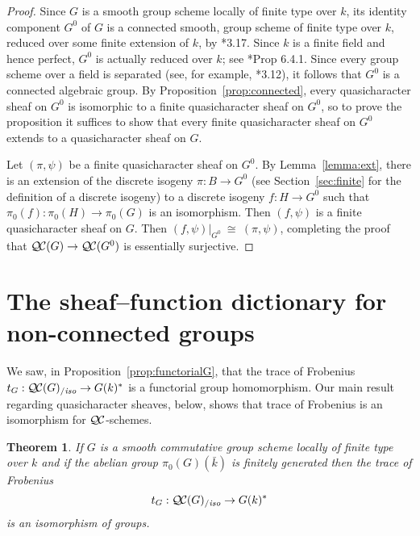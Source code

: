 \documentclass[11pt]{amsart}
\theoremstyle{plain}
\newtheorem{theorem}{Theorem}[section]
\theoremstyle{definition}
\theoremstyle{remark}
\newcommand{\bFq}{\bar{k}}
\newcommand{\Fq}{k}
\newcommand{\iso}{{\ \cong\ }}
\newcommand{\QC}{{\mathcal{Q\hskip-0.8pt C}}}
\newcommand{\QCiso}[1]{\QC(#1)_{/\textit{iso}}}
\newcommand{\trFrob}[1]{t_{#1}}
\begin{document}
\begin{proof}
  Since $G$ is a smooth group scheme locally of finite type over $\Fq$, its
  identity component $G^0$ of $G$ is a connected smooth, 
  group scheme of finite type over $\Fq$, reduced over some finite extension of $\Fq$, by
   \cite{vdGeer-Moonen:AbelianVarieties}*{3.17}. 
	Since $\Fq$ is a finite field and hence perfect, $G^0$ is actually reduced over $\Fq$;
	see \cite{EGAIV2}*{Prop 6.4.1}.
	Since every group scheme over a field is separated 
	(see, for example, \cite{vdGeer-Moonen:AbelianVarieties}*{3.12}),  
	it follows that $G^0$ is a connected algebraic group.
    By Proposition~\ref{prop:connected}, every
  quasicharacter sheaf on $G^0$ is isomorphic to a 
  finite quasicharacter sheaf on $G^0$, 
  so to prove the proposition it suffices to show that every 
  finite quasicharacter sheaf on $G^0$ extends to a quasicharacter sheaf on $G$.
  
 Let $(\pi,\psi)$ be a finite quasicharacter sheaf on $G^0$.
 By Lemma~\ref{lemma:ext}, there is an extension of the 
 discrete isogeny $\pi : B \to G^0$ 
 (see Section~\ref{sec:finite} for the definition of a discrete isogeny) 
 to a discrete isogeny $f : H \to G^0$ 
 such that $\pi_0(f) : \pi_0(H)\to \pi_0(G)$ is an isomorphism.
 Then $(f,\psi)$ is a finite quasicharacter sheaf on $G$.
 Then $(f,\psi)\vert_{G^0} \iso (\pi,\psi)$,
 completing the proof that $\QC(G)\to \QC(G^0)$ is essentially surjective.
\end{proof}

\section{The sheaf--function dictionary for non-connected groups}
\label{sec:snake}

We saw, in Proposition~\ref{prop:functorialG}, that the trace of Frobenius
$\trFrob{G} : \QCiso{G} \to G(\Fq)^*$ is a functorial group homomorphism.
Our main result regarding quasicharacter sheaves, below, shows that
trace of Frobenius is an isomorphism for $\QC$-schemes.

%
\begin{theorem}\label{thm:snake}
  If $G$ is a smooth commutative group scheme locally of finite type over
  $\Fq$ and if the abelian group $\pi_0(G)(\bFq)$
  is finitely generated then the trace of Frobenius
  \[
  \trFrob{G} : \QCiso{G} \to G(\Fq)^*
  \]
  is an isomorphism of groups.
\end{theorem}
\end{document}
